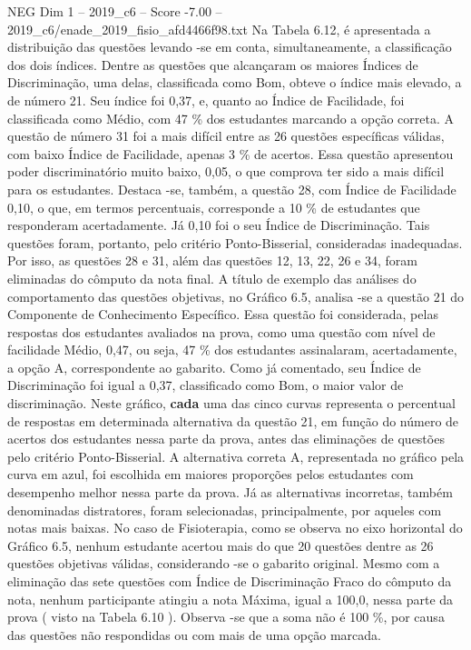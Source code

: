 \begin{textsample}{NEG Dim 1 – 2019\_c6 – Score -7.00 – 2019\_c6/enade\_2019\_fisio\_afd4466f98.txt}
Na Tabela 6.12, é apresentada a distribuição das questões levando -se em conta, simultaneamente, a classificação dos dois índices.
Dentre as questões que alcançaram os maiores Índices de Discriminação, uma delas, classificada como Bom, obteve o índice mais elevado, a de número 21.
Seu índice foi 0,37, e, quanto ao Índice de Facilidade, foi classificada como Médio, com 47 \% dos estudantes marcando a opção correta.
A questão de número 31 foi a mais difícil entre as 26 questões específicas válidas, com baixo Índice de Facilidade, apenas 3 \% de acertos.
Essa questão apresentou poder discriminatório muito baixo, 0,05, o que comprova ter sido a mais difícil para os estudantes.
Destaca -se, também, a questão 28, com Índice de Facilidade 0,10, o que, em termos percentuais, corresponde a 10 \% de estudantes que responderam acertadamente.
Já 0,10 foi o seu Índice de Discriminação.
Tais questões foram, portanto, pelo critério Ponto-Bisserial, consideradas inadequadas.
Por isso, as questões 28 e 31, além das questões 12, 13, 22, 26 e 34, foram eliminadas do cômputo da nota final.
A título de exemplo das análises do comportamento das questões objetivas, no Gráfico 6.5, analisa -se a questão 21 do Componente de Conhecimento Específico.
Essa questão foi considerada, pelas respostas dos estudantes avaliados na prova, como uma questão com nível de facilidade Médio, 0,47, ou seja, 47 \% dos estudantes assinalaram, acertadamente, a opção A, correspondente ao gabarito.
Como já comentado, seu Índice de Discriminação foi igual a 0,37, classificado como Bom, o maior valor de discriminação.
Neste gráfico, \textbf{cada} uma das cinco curvas representa o percentual de respostas em determinada alternativa da questão 21, em função do número de acertos dos estudantes nessa parte da prova, antes das eliminações de questões pelo critério Ponto-Bisserial.
A alternativa correta A, representada no gráfico pela curva em azul, foi escolhida em maiores proporções pelos estudantes com desempenho melhor nessa parte da prova.
Já as alternativas incorretas, também denominadas distratores, foram selecionadas, principalmente, por aqueles com notas mais baixas.
No caso de Fisioterapia, como se observa no eixo horizontal do Gráfico 6.5, nenhum estudante acertou mais do que 20 questões dentre as 26 questões objetivas válidas, considerando -se o gabarito original.
Mesmo com a eliminação das sete questões com Índice de Discriminação Fraco do cômputo da nota, nenhum participante atingiu a nota Máxima, igual a 100,0, nessa parte da prova ( visto na Tabela 6.10 ).
Observa -se que a soma não é 100 \%, por causa das questões não respondidas ou com mais de uma opção marcada.

\end{textsample}
